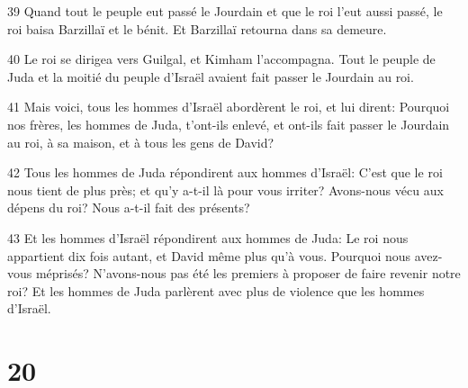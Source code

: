 \par 39 Quand tout le peuple eut passé le Jourdain et que le roi l'eut aussi passé, le roi baisa Barzillaï et le bénit. Et Barzillaï retourna dans sa demeure.
\par 40 Le roi se dirigea vers Guilgal, et Kimham l'accompagna. Tout le peuple de Juda et la moitié du peuple d'Israël avaient fait passer le Jourdain au roi.
\par 41 Mais voici, tous les hommes d'Israël abordèrent le roi, et lui dirent: Pourquoi nos frères, les hommes de Juda, t'ont-ils enlevé, et ont-ils fait passer le Jourdain au roi, à sa maison, et à tous les gens de David?
\par 42 Tous les hommes de Juda répondirent aux hommes d'Israël: C'est que le roi nous tient de plus près; et qu'y a-t-il là pour vous irriter? Avons-nous vécu aux dépens du roi? Nous a-t-il fait des présents?
\par 43 Et les hommes d'Israël répondirent aux hommes de Juda: Le roi nous appartient dix fois autant, et David même plus qu'à vous. Pourquoi nous avez-vous méprisés? N'avons-nous pas été les premiers à proposer de faire revenir notre roi? Et les hommes de Juda parlèrent avec plus de violence que les hommes d'Israël.

\chapter{20}


